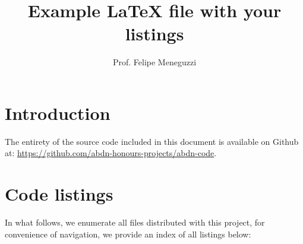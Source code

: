 \documentclass[a4paper]{article}
\title{Example LaTeX file with your listings}
\author{Prof. Felipe Meneguzzi}
\begin{document}
\maketitle

\section*{Introduction}

The entirety of the source code included in this document is available on Github at: \url{https://github.com/abdn-honours-projects/abdn-code}.

\section*{Code listings}

In what follows, we enumerate all files distributed with this project, for convenience of navigation, we provide an index of all listings below:

\lstlistoflistings














\end{document}
